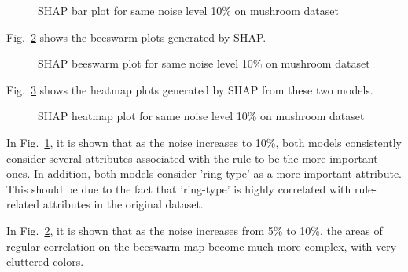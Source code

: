 \documentclass[runningheads,a4paper]{llncs}
\begin{document}
\begin{figure}[H]
	\centering
	
	\hfill
	
	
	\caption{SHAP bar plot for same noise level 10\% on mushroom dataset}
	\label{bar plots noise level 10}
\end{figure}
Fig.~\ref{bee plots noise level 10} shows the beeswarm plots generated by SHAP.
\begin{figure}[H]
	\centering
	
	\hfill
	
	
	\caption{SHAP beeswarm plot for same noise level 10\% on mushroom dataset}
	\label{bee plots noise level 10}
	
\end{figure}
Fig.~\ref{heat plots noise level 10} shows the heatmap plots generated by SHAP from these two models.
\begin{figure}[H]
	\centering
	
	\hfill
	
	
	\caption{SHAP heatmap plot for same noise level 10\% on mushroom dataset}
	\label{heat plots noise level 10}
	
\end{figure}
In Fig.~\ref{bar plots noise level 10}, it is shown that as the noise increases to 10\%, both models consistently consider several attributes associated with the rule to be the more important ones. In addition, both models consider 'ring-type' as a more important attribute. This should be due to the fact that 'ring-type' is highly correlated with rule-related attributes in the original dataset.

In Fig.~\ref{bee plots noise level 10}, it is shown that as the noise increases from 5\% to 10\%, the areas of regular correlation on the beeswarm map become much more complex, with very cluttered colors.
\end{document}
